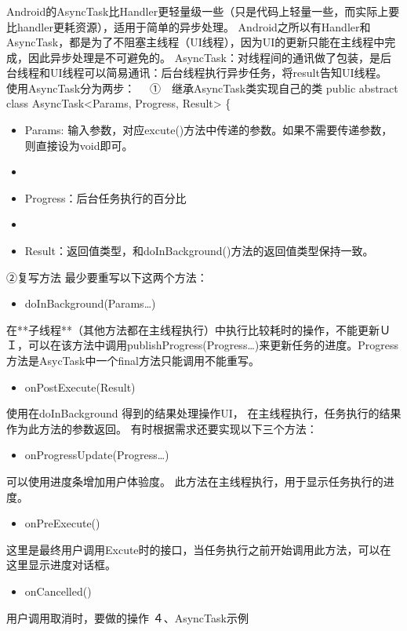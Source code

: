\documentclass[9pt, b5paper]{article}
\begin{document}
\subsubsection{}
\label{sec-9-0-3}
Android的AsyncTask比Handler更轻量级一些（只是代码上轻量一些，而实际上要比handler更耗资源），适用于简单的异步处理。
Android之所以有Handler和AsyncTask，都是为了不阻塞主线程（UI线程），因为UI的更新只能在主线程中完成，因此异步处理是不可避免的。
AsyncTask：对线程间的通讯做了包装，是后台线程和UI线程可以简易通讯：后台线程执行异步任务，将result告知UI线程。
使用AsyncTask分为两步：　
①　继承AsyncTask类实现自己的类
public abstract class AsyncTask<Params, Progress, Result> \{
\begin{itemize}
\item Params: 输入参数，对应excute()方法中传递的参数。如果不需要传递参数，则直接设为void即可。
\item 
\item Progress：后台任务执行的百分比
\item 
\item Result：返回值类型，和doInBackground()方法的返回值类型保持一致。
\end{itemize}
②复写方法
 最少要重写以下这两个方法：
\begin{itemize}
\item doInBackground(Params…)
\end{itemize}
在**子线程**（其他方法都在主线程执行）中执行比较耗时的操作，不能更新ＵＩ，可以在该方法中调用publishProgress(Progress…)来更新任务的进度。Progress方法是AsycTask中一个final方法只能调用不能重写。
\begin{itemize}
\item onPostExecute(Result)
\end{itemize}
使用在doInBackground 得到的结果处理操作UI， 在主线程执行，任务执行的结果作为此方法的参数返回。
有时根据需求还要实现以下三个方法：
\begin{itemize}
\item onProgressUpdate(Progress…)
\end{itemize}
可以使用进度条增加用户体验度。 此方法在主线程执行，用于显示任务执行的进度。
\begin{itemize}
\item onPreExecute()
\end{itemize}
这里是最终用户调用Excute时的接口，当任务执行之前开始调用此方法，可以在这里显示进度对话框。
\begin{itemize}
\item onCancelled()
\end{itemize}
用户调用取消时，要做的操作
 ４、AsyncTask示例
\end{document}
